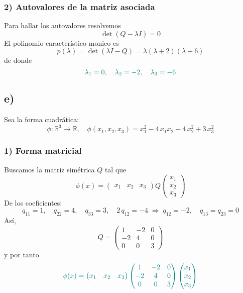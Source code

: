 \documentclass{article}
\begin{document}
\subsubsection*{2) Autovalores de la matriz asociada}

Para hallar los autovalores resolvemos
\[
\det(Q-\lambda I)=0
\]
El polinomio característico monico es
\[
p(\lambda)=\det(\lambda I - Q)
=\lambda(\lambda+2)(\lambda+6)
\]
de donde
\[
\color{teal}
\lambda_1=0,\quad \lambda_2=-2,\quad \lambda_3=-6
\]

\subsection*{e)}



Sea la forma cuadrática:
\[
\phi:\mathbb{R}^3\to\mathbb{R},
\quad
\phi(x_1,x_2,x_3)=x_1^2-4\,x_1x_2+4\,x_2^2+3\,x_3^2
\]

\subsubsection*{1) Forma matricial}

Buscamos la matriz simétrica \(Q\) tal que
\[
\phi(x)=
\begin{pmatrix}x_1 & x_2 & x_3\end{pmatrix}
Q
\begin{pmatrix}x_1\\x_2\\x_3\end{pmatrix}
\]
De los coeficientes:
\[
q_{11}=1,\quad
q_{22}=4,\quad
q_{33}=3,
\quad
2\,q_{12}=-4\;\Longrightarrow\;q_{12}=-2,
\quad
q_{13}=q_{23}=0
\]
Así,
\[
Q=
\begin{pmatrix}
1  & -2 & 0\\[4pt]
-2 &  4 & 0\\[4pt]
0  &  0 & 3
\end{pmatrix}
\]
y por tanto
\[
\color{teal}
\phi(x)=
\begin{pmatrix}x_1 & x_2 & x_3\end{pmatrix}
\begin{pmatrix}
1  & -2 & 0\\
-2 &  4 & 0\\
0  &  0 & 3
\end{pmatrix}
\begin{pmatrix}x_1\\x_2\\x_3\end{pmatrix}
\]
\end{document}
